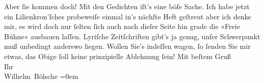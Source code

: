 \begin{ledgroupsized}[t]{13cm}
               Aber ſie kommen doch!\pend
           \pstart
           Mit den Gedichten iſt’s eine böſe Sache. Ich habe jetzt ein Lilienkron’ſches probeweiſe einmal
               in’s nächſte Heft geſtreut {\pb}aber ich denke mir, es
               wird doch nur ſelten ſich auch nach dieſer Seite hin grade die »Freie Bühne« ausbauen laſſen. Lyriſche Zeitſchriften gibt’s ja
               genug, unſer Schwerpunkt muß unbedingt anderswo liegen. Wollen Sie’s indeſſen wagen,
               ſo ſenden Sie mir etwas, das Obige ſoll keine prinzipielle Ablehnung ſein!\pend
           \pstart
           Mit beſtem Gruß{\\[\baselineskip]}Ihr{\\[\baselineskip]}\spacefill\mbox{Wilhelm Bölsche}\pend
           \leftskip=0em{}
         
         \endnumbering{}\end{ledgroupsized}  \newcommand{\dateiname}{L00087}\newcommand{\titel}{Wilhelm Bölsche an Arthur Schnitzler, 24. 3. 1892}\newcommand{\editorInnen}{Martin Anton Müller und Gerd-Hermann Susen}
      